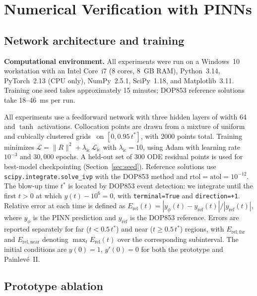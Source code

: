 \documentclass[11pt,a4paper]{article}
\theoremstyle{definition}
\begin{document}
\section{Numerical Verification with PINNs}
\label{sec:numerics}

\subsection{Network architecture and training}

\noindent\textbf{Computational environment.} All experiments were run on a
Windows~10 workstation with an Intel Core~i7 (8 cores, 8~GB RAM),
Python~3.14, PyTorch~2.13 (CPU only), NumPy~2.5.1, SciPy~1.18, and Matplotlib~3.11.
Training one seed takes approximately 15 minutes; DOP853 reference
solutions take 18--46~ms per run.


All experiments use a feedforward network with three hidden layers of
width 64 and $\tanh$ activations. Collocation points are drawn from a
mixture of uniform and cubically clustered grids~\cite{Trefethen2000} on $[0, 0.95\,t^*]$,
with 2000 points total. Training minimizes
$\mathcal{L} = \|R\|^2 + \lambda_{\mathrm{ic}}\,\mathcal{L}_{\mathrm{ic}}$
with $\lambda_{\mathrm{ic}} = 10$, using Adam with learning rate
$10^{-3}$ and $30{,}000$ epochs. A held-out set of 300 ODE residual points is used for best-model checkpointing (Section~\ref{sec:seed}).
Reference solutions use \texttt{scipy.integrate.solve\_ivp} with the
DOP853 method and $\mathrm{rtol}=\mathrm{atol}=10^{-12}$.
The blow-up time $t^*$ is located by DOP853 event detection: we integrate until the first $t>0$ at which $y(t) - 10^{6} = 0$, with \texttt{terminal=True} and \texttt{direction=+1}. Relative error at each time is defined as $E_{\mathrm{rel}}(t) = |y_\phi(t) - y_{\mathrm{ref}}(t)| / |y_{\mathrm{ref}}(t)|$, where $y_\phi$ is the PINN prediction and $y_{\mathrm{ref}}$ is the DOP853 reference. Errors are reported separately for far ($t < 0.5\,t^*$) and near ($t \ge 0.5\,t^*$) regions, with $E_{\mathrm{rel,far}}$ and $E_{\mathrm{rel,near}}$ denoting $\max_t E_{\mathrm{rel}}(t)$ over the corresponding subinterval. The initial conditions are $y(0)=1$, $y'(0)=0$ for both the prototype and Painlev\'e~II.

\subsection{Prototype ablation}
\label{sec:proto-ablation}
\end{document}

